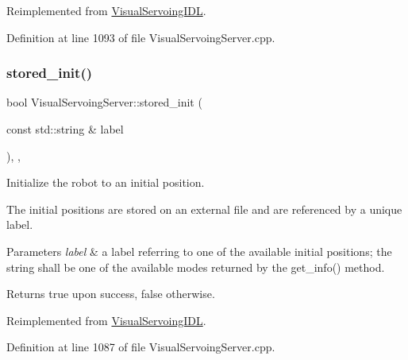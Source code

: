 Reimplemented from \hyperlink{classVisualServoingIDL_aa751cf35650259ae7cff331c9d19c694}{Visual\+Servoing\+I\+DL}.



Definition at line 1093 of file Visual\+Servoing\+Server.\+cpp.

\mbox{\label{classVisualServoingServer_aded37e0e0111c40fe5f869b16bb1f799}} 
\subsubsection{\texorpdfstring{stored\+\_\+init()}{stored\_init()}}
{\footnotesize\ttfamily bool Visual\+Servoing\+Server\+::stored\+\_\+init (\begin{DoxyParamCaption}\item[{const std\+::string \&}]{label }\end{DoxyParamCaption})\hspace{0.3cm}{\ttfamily [override]}, {\ttfamily [protected]}, {\ttfamily [virtual]}}



Initialize the robot to an initial position. 

The initial positions are stored on an external file and are referenced by a unique label. 
\begin{DoxyParams}{Parameters}
{\em label} & a label referring to one of the available initial positions; the string shall be one of the available modes returned by the get\+\_\+info() method. \\
\hline
\end{DoxyParams}
\begin{DoxyReturn}{Returns}
true upon success, false otherwise. 
\end{DoxyReturn}


Reimplemented from \hyperlink{classVisualServoingIDL_a20ff1561b87126c9b852eacd5ea59d26}{Visual\+Servoing\+I\+DL}.



Definition at line 1087 of file Visual\+Servoing\+Server.\+cpp.

\mbox{\label{classVisualServoingServer_a6d6ec7fee5b76d8a59d75a626b1bd11b}} 
